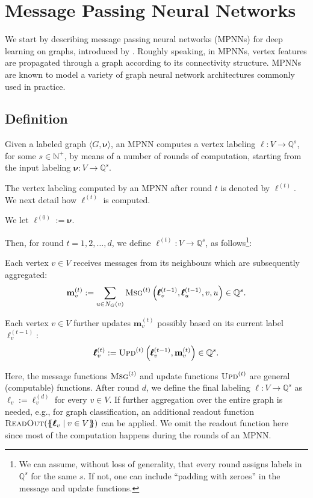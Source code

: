
\section{Message Passing Neural Networks}
We start by describing message passing neural networks (MPNNs) for  deep learning on graphs, introduced by \cite{GilmerSRVD17}. Roughly speaking, in MPNNs, vertex features are propagated through a graph according to its connectivity structure. MPNNs are known to model a variety of graph neural network architectures commonly used in practice.

\subsection{Definition}
Given a labeled graph $\langle G,\pmb{\nu}\rangle$, an MPNN computes a vertex labeling $\pmb{\ell}:V\to \mathbb{Q}^{s}$, for some $s\in\mathbb{N}^+$, by means of a number of rounds of computation, starting from the input labeling $\pmb{\nu}:V\to\mathbb{Q}^s$.

The vertex labeling computed by an MPNN after round $t$ is denoted by $\pmb{\ell}^{(t)}$. We next detail how $\pmb{\ell}^{(t)}$ is computed.
\begin{description}\setlength{\itemsep}{-0.4ex}
\item [Initialisation.]  We let $\pmb{\ell}^{(0)}:=\pmb{\nu}$.
\end{description}
Then, for round $t=1,2,\ldots,d$, we define $\pmb{\ell}^{(t)}:V\to\mathbb{Q}^{s}$, as follows\footnote{We can assume, without loss of generality, that every round assigns labels in $\mathbb{Q}^s$ for the same $s$. If not, one can include ``padding with zeroes'' in the message and update functions.}:
\begin{description}\setlength{\itemsep}{-0.4ex}
\item [Message Passing.] Each vertex $v\in V$ receives messages from its neighbours which are subsequently aggregated:
$$
\mathbf{m}^{(t)}_{v}:=\sum_{u\in N_G(v)}\textsc{Msg}^{(t)}\left(\pmb{\ell}^{(t-1)}_v,\pmb{\ell}^{(t-1)}_u,v,u\right)\in\mathbb{Q}^{s}.
$$
\item [Updating.] Each vertex $v\in V$ further updates $\mathbf{m}^{(t)}_{v}$ possibly based on its current label $\pmb{\ell}^{(t-1)}_v$:
$$
\pmb{\ell}^{(t)}_v:=\textsc{Upd}^{(t)}\left(\pmb{\ell}^{(t-1)}_v,\mathbf{m}^{(t)}_{v}\right)\in\mathbb{Q}^{s}.
$$
\end{description}
Here, the message functions $\textsc{Msg}^{(t)}$ and update functions $\textsc{Upd}^{(t)}$ are general (computable) functions.
After round $d$, we define the final labeling $\pmb{\ell}:V\to\mathbb{Q}^{s}$ as  $\pmb{\ell}_v:=\pmb{\ell}^{(d)}_v$ for every $v\in V$. If further aggregation over the entire graph is needed, e.g., for graph classification, an additional readout function 
$\textsc{ReadOut}(\{\!\!\{\pmb{\ell}_v\mid v\in V\}\!\!\})$ can be applied. We omit the readout function here since most of the computation happens during the rounds of an MPNN.

